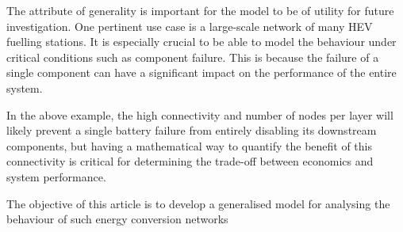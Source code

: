 \documentclass[]{article}
\def\nstyle{int(\lay<\Nnodlen?min(2,\lay):3)} %
\numberwithin{equation}{section}
\theoremstyle{plain} %
\theoremstyle{definition}
\theoremstyle{remark}
\begin{document}
The attribute of generality is important for the model to be of utility for future investigation.
One pertinent use case is a large-scale network of many HEV fuelling stations.
It is especially crucial to be able to model the behaviour under critical conditions such as component failure.
This is because the failure of a single component can have a significant impact on the performance of the entire system.

\begin{center}
\end{center}

In the above example, the high connectivity and number of nodes per layer will likely prevent a single battery failure from entirely disabling its downstream components,
but having a mathematical way to quantify the benefit of this connectivity
is critical for determining the trade-off between economics and system performance.

The objective of this article is to develop a generalised model for analysing the behaviour of such energy conversion networks
\end{document}
